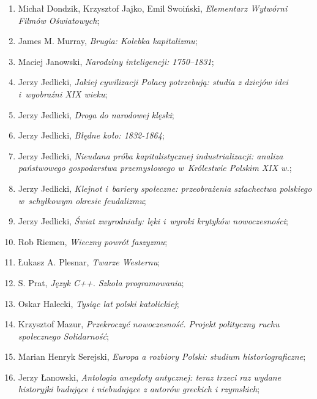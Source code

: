 \documentclass[a4paper,11pt]{article}
\begin{document}
\begin{enumerate}
\item Michał Dondzik, Krzysztof Jajko, Emil Swoiński, \textit{Elementarz
    Wytwórni Filmów Oświatowych};

\item James M. Murray, \textit{Brugia: Kolebka kapitalizmu};

\item Maciej Janowski, \textit{Narodziny inteligencji: 1750--1831};

\item Jerzy Jedlicki, \textit{Jakiej cywilizacji Polacy potrzebują:
    studia z dziejów idei i~wyobraźni XIX wieku};

\item Jerzy Jedlicki, \textit{Droga do narodowej klęski};

\item Jerzy Jedlicki, \textit{Błędne koło: 1832-1864};

\item Jerzy Jedlicki, \textit{Nieudana próba kapitalistycznej
    industrializacji: analiza państwowego gospodarstwa przemysłowego
    w~Królestwie Polskim XIX w.};

\item Jerzy Jedlicki, \textit{Klejnot i~bariery społeczne: przeobrażenia
    szlachectwa polskiego w~schyłkowym okresie feudalizmu};

\item Jerzy Jedlicki, \textit{Świat zwyrodniały: lęki i~wyroki krytyków
    nowoczesności};

\item Rob Riemen, \textit{Wieczny powrót faszyzmu};

\item Łukasz A. Plesnar, \textit{Twarze Westernu};

\item S. Prat, \textit{Język C++. Szkoła programowania};


\item Oskar Halecki, \textit{Tysiąc lat polski katolickiej};

\item Krzysztof Mazur, \textit{Przekroczyć nowoczesność. Projekt
    polityczny ruchu społecznego Solidarność};

\item Marian Henryk Serejski, \textit{Europa a rozbiory Polski: studium
    historiograficzne};

\item Jerzy Łanowski, \textit{Antologia anegdoty antycznej: teraz trzeci
    raz wydane historyjki budujące i niebudujące z autorów greckich i
    rzymskich};


\end{enumerate}
\end{document}
